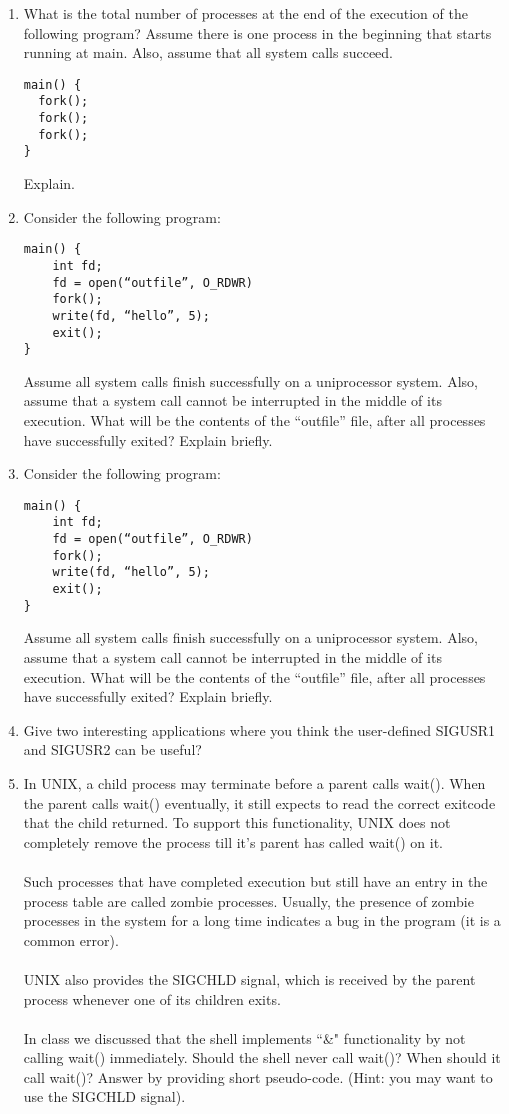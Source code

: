 \begin{enumerate}
\item What is the total number of processes at the end of the execution of the following program? Assume there is one process in the beginning that starts running at main. Also, assume that all system calls succeed.
\begin{verbatim}
main() {
  fork();
  fork();
  fork();
}
\end{verbatim}
Explain. 

\item
Consider the following program:
\begin{verbatim}
main() {
    int fd;
    fd = open(“outfile”, O_RDWR)
    fork();
    write(fd, “hello”, 5);
    exit();
}
\end{verbatim}
Assume all system calls finish successfully on a uniprocessor system. Also, assume that a system call cannot be interrupted in the middle of its execution. What will be the contents of the “outfile” file, after all processes have successfully exited? Explain briefly.

\item
Consider the following program:
\begin{verbatim}
main() {
    int fd;
    fd = open(“outfile”, O_RDWR)
    fork();
    write(fd, “hello”, 5);
    exit();
}
\end{verbatim}
Assume all system calls finish successfully on a uniprocessor system. Also, assume that a system call cannot be interrupted in the middle of its execution. What will be the contents of the “outfile” file, after all processes have successfully exited? Explain briefly.

\item Give two interesting applications where you think the user-defined SIGUSR1 and
SIGUSR2 can be useful?

\item
In UNIX, a child process may terminate before a parent calls wait(). When the parent calls wait() eventually, it still expects to read the correct exitcode that the child returned. To support this functionality, UNIX does not completely remove the process till it's parent has called wait() on it.
\\\\
Such processes that have completed execution but still have an entry in the process table are called zombie processes. Usually, the presence of zombie processes in the system for a long time indicates a bug in the program (it is a common error).
\\\\
UNIX also provides the SIGCHLD signal, which is received by the parent process whenever one of
its children exits.
\\\\
In class we discussed that the shell implements ``\&" functionality by not
calling wait() immediately. Should the shell never call wait()? When should it call wait()? Answer by providing short pseudo-code. (Hint: you may want to use the SIGCHLD signal).



\end{enumerate}
